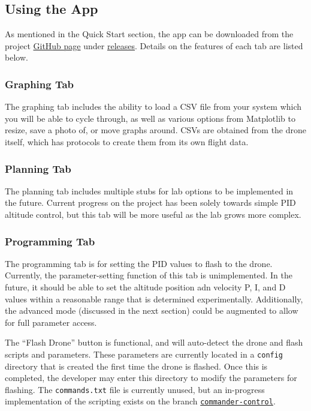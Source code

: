 \documentclass[12pt, titlepage]{article}
\begin{document}
\subsection{Using the App}
As mentioned in the Quick Start section, the app can be downloaded from the project \href{https://github.com/Team-Wingfeather/fcl_senior_design}{GitHub page} under \href{https://github.com/Team-Wingfeather/fcl_senior_design/releases}{releases}. Details on the features of each tab are listed below.
\subsubsection{Graphing Tab}
The graphing tab includes the ability to load a CSV file from your system which you will be able to cycle through, as well as various options from Matplotlib to resize, save a photo of, or move graphs around. CSVs are obtained from the drone itself, which has protocols to create them from its own flight data.

\subsubsection{Planning Tab}
The planning tab includes multiple stubs for lab options to be implemented in the future. Current progress on the project has been solely towards simple PID altitude control, but this tab will be more useful as the lab grows more complex.

\subsubsection{Programming Tab}
The programming tab is for setting the PID values to flash to the drone. Currently, the parameter-setting function of this tab is unimplemented. In the future, it should be able to set the altitude position adn velocity P, I, and D values within a reasonable range that is determined experimentally. Additionally, the advanced mode (discussed in the next section) could be augmented to allow for full parameter access.

The ``Flash Drone'' button is functional, and will auto-detect the drone and flash scripts and parameters. These parameters are currently located in a \texttt{config} directory that is created the first time the drone is flashed. Once this is completed, the developer may enter this directory to modify the parameters for flashing. The \texttt{commands.txt} file is currently unused, but an in-progress implementation of the scripting exists on the branch \href{https://github.com/Team-Wingfeather/fcl_senior_design/tree/commander-control}{\texttt{commander-control}}.
\end{document}

